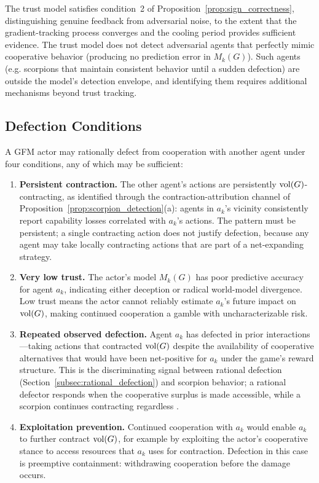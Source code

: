 The trust model satisfies condition~2 of
Proposition~\ref{prop:sign_correctness}, distinguishing genuine feedback from
adversarial noise, to the extent that the gradient-tracking process converges
and the cooling period provides sufficient evidence. The trust model does not
detect adversarial agents that perfectly mimic cooperative behavior (producing
no prediction error in $M_k(G)$). Such agents (e.g. scorpions that maintain
consistent behavior until a sudden defection) are outside the model's detection
envelope, and identifying them requires additional mechanisms beyond trust
tracking.

\subsection{Defection Conditions}
\label{subsec:defection_conditions}

A GFM actor may rationally defect from cooperation with another agent under
four conditions, any of which may be sufficient:

\begin{enumerate}
\item \textbf{Persistent contraction.} The other agent's actions are persistently $\operatorname{vol}(G)$-contracting, as identified through the contraction-attribution channel of Proposition~\ref{prop:scorpion_detection}(a): agents in $a_k$'s vicinity consistently report capability losses correlated with $a_k$'s actions. The pattern must be persistent; a single contracting action does not justify defection, because any agent may take locally contracting actions that are part of a net-expanding strategy.

\item \textbf{Very low trust.} The actor's model $M_k(G)$ has poor predictive accuracy for agent $a_k$, indicating either deception or radical world-model divergence. Low trust means the actor cannot reliably estimate $a_k$'s future impact on $\operatorname{vol}(G)$, making continued cooperation a gamble with uncharacterizable risk.

\item \textbf{Repeated observed defection.} Agent $a_k$ has defected in prior interactions---taking actions that contracted $\operatorname{vol}(G)$ despite the availability of cooperative alternatives that would have been net-positive for $a_k$ under the game's reward structure. This is the discriminating signal between rational defection (Section~\ref{subsec:rational_defection}) and scorpion behavior; a rational defector responds when the cooperative surplus is made accessible, while a scorpion continues contracting regardless \citep{axelrod1984evolution}.

\item \textbf{Exploitation prevention.} Continued cooperation with $a_k$ would enable $a_k$ to further contract $\operatorname{vol}(G)$, for example by exploiting the actor's cooperative stance to access resources that $a_k$ uses for contraction. Defection in this case is preemptive containment: withdrawing cooperation before the damage occurs.
\end{enumerate}

